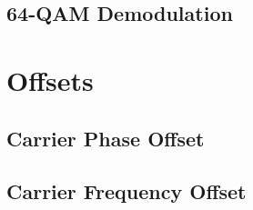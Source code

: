 \documentclass[]{article}
\begin{document}
\newpage
\subsection{64-QAM Demodulation}
\label{app:qam_64_demod}


\newpage
\section{Offsets}
\label{app:offsets}
\subsection{Carrier Phase Offset}
\label{app:phase_offset}


\newpage
\subsection{Carrier Frequency Offset}
\label{app:freq_offset}

\end{document}
